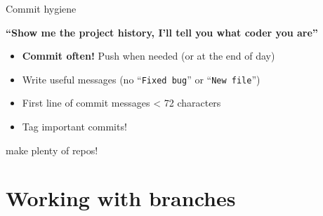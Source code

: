 \documentclass[compress]{beamer}
\begin{document}
\begin{frame}{Commit hygiene}
    \centering

    {\bf ``Show me the project history, I'll tell you what coder you are''}

    \begin{itemize}
        \item<1-> {\bf Commit often!} Push when needed (or at the end of day)
        \item<2-> Write useful messages (no ``\texttt{Fixed bug}'' or ``\texttt{New
            file}'')
        \item<2-> First line of commit messages < 72 characters
        \item<3-> Tag important commits!
    \end{itemize}

\end{frame}

\begin{frame}{}
    \centering

    make plenty of repos!
\end{frame}

\section{Working with branches}
\end{document}
